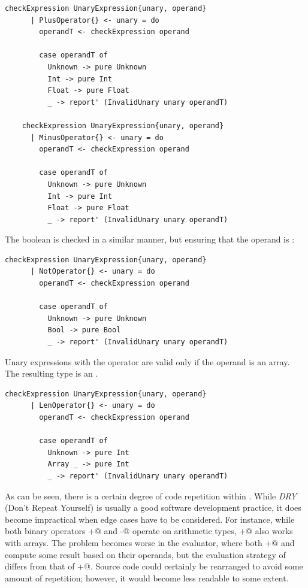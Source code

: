 \documentclass[UdineBachThesis,american,11pt]{PhdThesis}
\begin{document}
  \begin{lstlisting}[gobble=4,basicstyle=\ttfamily\small]
    checkExpression UnaryExpression{unary, operand}
      | PlusOperator{} <- unary = do
        operandT <- checkExpression operand

        case operandT of
          Unknown -> pure Unknown
          Int -> pure Int
          Float -> pure Float
          _ -> report' (InvalidUnary unary operandT)

    checkExpression UnaryExpression{unary, operand}
      | MinusOperator{} <- unary = do
        operandT <- checkExpression operand

        case operandT of
          Unknown -> pure Unknown
          Int -> pure Int
          Float -> pure Float
          _ -> report' (InvalidUnary unary operandT)
  \end{lstlisting}

  The boolean \lstinline@not@ is checked in a similar manner, but ensuring that
  the operand is \lstinline@Bool@:

  \begin{lstlisting}[gobble=4,basicstyle=\ttfamily\small]
    checkExpression UnaryExpression{unary, operand}
      | NotOperator{} <- unary = do
        operandT <- checkExpression operand

        case operandT of
          Unknown -> pure Unknown
          Bool -> pure Bool
          _ -> report' (InvalidUnary unary operandT)
  \end{lstlisting}

  Unary expressions with the operator \lstinline@len@ are valid only if the
  operand is an array. The resulting type is an \lstinline@Int@.

  \begin{lstlisting}[gobble=4,basicstyle=\ttfamily\small]
    checkExpression UnaryExpression{unary, operand}
      | LenOperator{} <- unary = do
        operandT <- checkExpression operand

        case operandT of
          Unknown -> pure Int
          Array _ -> pure Int
          _ -> report' (InvalidUnary unary operandT)
  \end{lstlisting}

  \newpage

  As can be seen, there is a certain degree of code repetition within
  \lstinline@checkExpression@. While \emph{DRY} (Don't Repeat Yourself) is
  usually a good software development practice, it does become impractical when
  edge cases have to be considered. For instance, while both binary operators
  \lstinline@+@ and \lstinline@-@ operate on arithmetic types, \lstinline@+@
  also works with arrays. The problem becomes worse in the evaluator, where both
  \lstinline@+@ and \lstinline@and@ compute some result based on their operands,
  but the evaluation strategy of \lstinline@and@ differs from that of
  \lstinline@+@. Source code could certainly be rearranged to avoid some amount
  of repetition; however, it would become less readable to some extent.
\end{document}
